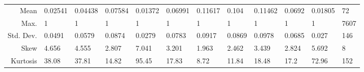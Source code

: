 \documentclass[11pt, a4paper]{article}
\begin{document}
\begin{table}[ht]
{\begin{tabular}{|r|lllllllllll|}
  Mean & 0.02541 & 0.04438 & 0.07584 & 0.01372 & 0.06991 & 0.11617 & 0.104 & 0.11462 & 0.0692 & 0.01805 & 72 \\
  Max. & 1 & 1 & 1 & 1 & 1 & 1 & 1 & 1 & 1 & 1 & 7607 \\
  Std. Dev. & 0.0491 & 0.0579 & 0.0874 & 0.0279 & 0.0783 & 0.0917 & 0.0869 & 0.0978 & 0.0685 & 0.027 & 146 \\
  Skew & 4.656 & 4.555 & 2.807 & 7.041 & 3.201 & 1.963 & 2.462 & 3.439 & 2.824 & 5.692 & 8 \\
  Kurtosis & 38.08 & 37.81 & 14.82 & 95.45 & 17.83 & 8.72 & 11.84 & 18.48 & 17.2 & 72.96 & 152 \\
   \hline
\end{tabular}}
\end{table}
\end{document}
